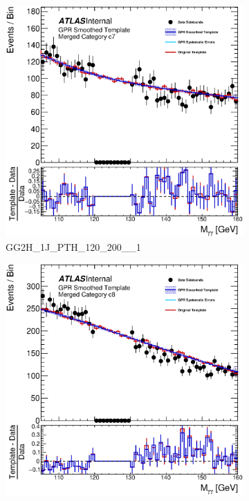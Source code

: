 \begin{figure}
\begin{center}
\begin{subfigure}[T]{0.49\linewidth}
	\includegraphics[width=\linewidth]{figures/background/gpr/coupCatTemplates/GPR_Smoothed_Plot_hmgg_c7.eps}
	\caption{GG2H\_1J\_PTH\_120\_200\_\_1}
\end{subfigure}
\begin{subfigure}[T]{0.49\linewidth}
	\centering
	\includegraphics[width=\linewidth]{figures/background/gpr/coupCatTemplates/GPR_Smoothed_Plot_hmgg_c8.eps}

\end{subfigure}
\end{center}
\end{figure}
